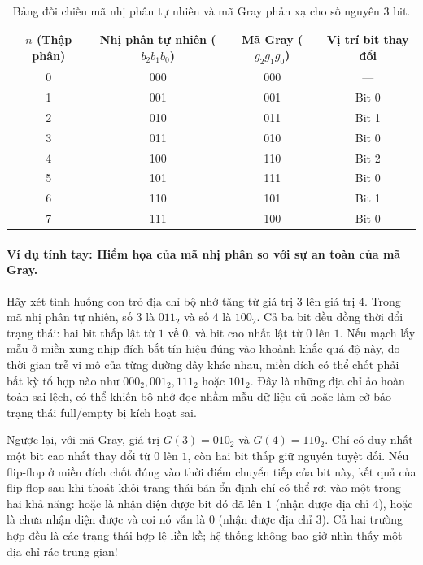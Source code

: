 \begin{table}[H]
\centering
\small
\caption{Bảng đối chiếu mã nhị phân tự nhiên và mã Gray phản xạ cho số nguyên 3 bit.}
\label{tab:ch02_gray_code}
\begin{tabular}{@{}cccc@{}}
\toprule
$n$ (Thập phân) & Nhị phân tự nhiên ($b_2 b_1 b_0$) & Mã Gray ($g_2 g_1 g_0$) & Vị trí bit thay đổi \\
\midrule
0 & 000 & 000 & --- \\
1 & 001 & 001 & Bit 0 \\
2 & 010 & 011 & Bit 1 \\
3 & 011 & 010 & Bit 0 \\
4 & 100 & 110 & Bit 2 \\
5 & 101 & 111 & Bit 0 \\
6 & 110 & 101 & Bit 1 \\
7 & 111 & 100 & Bit 0 \\
\bottomrule
\end{tabular}
\end{table}

\paragraph{Ví dụ tính tay: Hiểm họa của mã nhị phân so với sự an toàn của mã Gray.}
Hãy xét tình huống con trỏ địa chỉ bộ nhớ tăng từ giá trị $3$ lên giá trị $4$. Trong mã nhị phân tự nhiên, số $3$ là $011_2$ và số $4$ là $100_2$. Cả ba bit đều đồng thời đổi trạng thái: hai bit thấp lật từ $1$ về $0$, và bit cao nhất lật từ $0$ lên $1$. Nếu mạch lấy mẫu ở miền xung nhịp đích bắt tín hiệu đúng vào khoảnh khắc quá độ này, do thời gian trễ vi mô của từng đường dây khác nhau, miền đích có thể chốt phải bất kỳ tổ hợp nào như $000_2, 001_2, 111_2$ hoặc $101_2$. Đây là những địa chỉ ảo hoàn toàn sai lệch, có thể khiến bộ nhớ đọc nhầm mẫu dữ liệu cũ hoặc làm cờ báo trạng thái full/empty bị kích hoạt sai.

Ngược lại, với mã Gray, giá trị $G(3) = 010_2$ và $G(4) = 110_2$. Chỉ có duy nhất một bit cao nhất thay đổi từ $0$ lên $1$, còn hai bit thấp giữ nguyên tuyệt đối. Nếu flip-flop ở miền đích chốt đúng vào thời điểm chuyển tiếp của bit này, kết quả của flip-flop sau khi thoát khỏi trạng thái bán ổn định chỉ có thể rơi vào một trong hai khả năng: hoặc là nhận diện được bit đó đã lên $1$ (nhận được địa chỉ $4$), hoặc là chưa nhận diện được và coi nó vẫn là $0$ (nhận được địa chỉ $3$). Cả hai trường hợp đều là các trạng thái hợp lệ liền kề; hệ thống không bao giờ nhìn thấy một địa chỉ rác trung gian!

